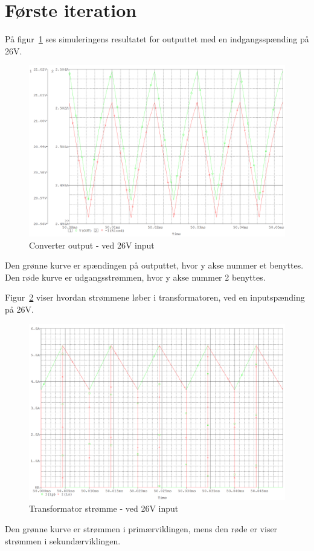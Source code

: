 \section{Første iteration}
På figur~\ref{fig:26V_ideal_output} ses simuleringens resultatet for outputtet med en indgangsspænding på 26V.
\begin{figure}[H]
	\center
	\includegraphics[max width=0.8\linewidth]{../dokumentation/tex/1iteration/billeder/26V_output.PNG}
	\caption{Converter output - ved 26V input}
	\label{fig:26V_ideal_output}
\end{figure}
Den grønne kurve er spændingen på outputtet, hvor y akse nummer et benyttes. Den røde kurve er udgangsstrømmen, hvor y akse nummer 2 benyttes.
 
Figur~\ref{fig:26V_transformer_current} viser hvordan strømmene løber i transformatoren, ved en inputspænding på 26V.
\begin{figure}[H]
	\center
	\includegraphics[max width=0.7\linewidth]{../dokumentation/tex/1iteration/billeder/26V_transformer_current.PNG}
	\caption{Transformator strømme - ved 26V input}
	\label{fig:26V_transformer_current}
\end{figure}
Den grønne kurve er strømmen i primærviklingen, mens den røde er viser strømmen i sekundærviklingen.

